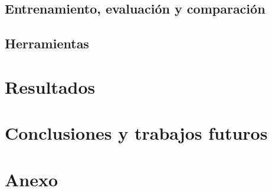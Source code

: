\documentclass[a4paper,12pt,spanish]{book}
\begin{document}
\section{Entrenamiento, evaluación y comparación} \label{sec:comparacion}


\section{Herramientas}


\chapter{Resultados} \label{chap:resultados}









\chapter{Conclusiones y trabajos futuros}


\newpage
\footnotesize
\printbibliography[heading=bibintoc]

\appendix
\chapter*{Anexo}
\label{chap:anexo}


\newpage
\newpage
\vfill
\addtocounter{page}{-1}
\clearpage
\thispagestyle{empty}
\phantom{a}
\vfill
\newpage
\vfill
\addtocounter{page}{-1}
\end{document}

